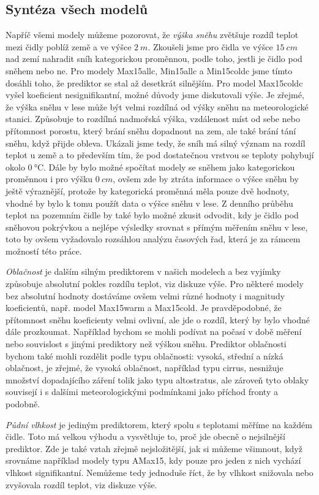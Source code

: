 \subsection{Syntéza všech modelů}
Napříč všemi modely můžeme pozorovat, že \textit{výška sněhu} zvětšuje rozdíl teplot mezi čidly poblíž země a ve výšce $\SI{2}{m}$. Zkoušeli jsme pro čidla ve výšce $\SI{15}{cm}$ nad zemí nahradit sníh kategorickou proměnnou, podle toho, jestli je čidlo pod sněhem nebo ne. Pro modely Max15allc, Min15allc a Min15coldc jsme tímto dosáhli toho, že prediktor se stal až desetkrát silnějším. Pro model Max15coldc vyšel koeficient nesignifikantní, možné důvody jsme diskutovali výše. Je zřejmé, že výška sněhu v lese může být velmi rozdílná od výšky sněhu na meteorologické stanici. Způsobuje to rozdílná nadmořská výška, vzdálenost míst od sebe nebo přítomnost porostu, který brání sněhu dopadnout na zem, ale také brání tání sněhu, když přijde obleva. Ukázali jsme tedy, že sníh má silný význam na rozdíl teplot u země a to především tím, že pod dostatečnou vrstvou se teploty pohybují okolo $\SI{0}{\celsius}$. Dále by bylo možné spočítat modely se sněhem jako kategorickou proměnnou i pro výšku $\SI{0}{cm}$, ovšem zde by ztráta informace o výšce sněhu by ještě výraznější, protože by kategorická proměnná měla pouze dvě hodnoty, vhodné by bylo k tomu použít data o výšce sněhu v lese. Z denního průběhu teplot na pozemním čidle by také bylo možné zkusit odvodit, kdy je čidlo pod sněhovou pokrývkou a nejlépe výsledky srovnat s přímým měřením sněhu v lese, toto by ovšem vyžadovalo rozsáhlou analýzu časových řad, která je za rámcem možností této práce.

\textit{Oblačnost} je dalším silným prediktorem v našich modelech a bez vyjímky způsobuje absolutní pokles rozdílu teplot, viz diskuze výše. Pro některé modely bez absolutní hodnoty dostáváme ovšem velmi různé hodnoty i magnitudy koeficientů, např. model Max15warm a Max15cold. Je pravděpodobné, že přítomnost sněhu koeficienty velmi ovlivní, ale jde o rozdíl, který by bylo vhodné dále prozkoumat. Například bychom se mohli podívat na počasí v době měření nebo souvislost s jinými prediktory než výškou sněhu. Prediktor oblačnosti bychom také mohli rozdělit podle typu oblačnosti: vysoká, střední a nízká oblačnost, je zřejmé, že vysoká oblačnost, například typu cirrus, nesnižuje množství dopadajícího záření tolik jako typu altostratus, ale zároveň tyto oblaky souvisejí i s dalšími meteorologickými podmínkami jako příchod fronty a podobně.

\textit{Půdní vlhkost} je jediným prediktorem, který spolu s teplotami měříme na každém čidle. Toto má velkou výhodu a vysvětluje to, proč jde obecně o nejsilnější prediktor. Zde je také vztah zřejmě nejsložitější, jak si můžeme všimnout, když srovnáme například modely typu AMax15, kdy pouze pro jeden z nich vychází vlhkost signifikantní. Nemůžeme tedy jednoduše říct, že by vlhkost snižovala nebo zvyšovala rozdíl teplot, viz diskuze výše.

